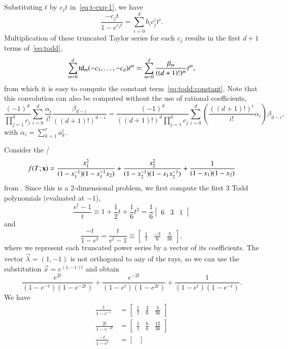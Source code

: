 Substituting $t$ by $c_j t$ in~\eqref{eq:t-exp-1}, we have
$$
\frac{-c_j t}{1-e^{c_j t}} = \sum_{i=0}^d b_i c_j^i t^i
.
$$
Multiplication of these truncated Taylor series for each $c_j$
results in the first $d+1$ terms of~\eqref{eq:todd},
$$
    \sum_{m=0}^{d} \operatorname{td}_m(-c_1, \ldots, -c_d) t^m
\eqqcolon
    \sum_{m=0}^{d} \frac{\beta_m}{((d+1)!)^m} t^m
,
$$
from which
it is easy to compute the constant term~\eqref{eq:todd:constant}.
Note that this convolution can also be computed without the use
of rational coefficients,
$$
\frac{(-1)^d}{\prod_{j=1}^d c_j}
    \sum_{i=0}^d \frac{\alpha_i}{i!} \frac{\beta_{d-i}}{((d+1)!)^{d-i}}
=
\frac{(-1)^d}{((d+1)!)^d\prod_{j=1}^d c_j}
    \sum_{i=0}^d \left(\frac{((d+1)!)^i}{i!}\alpha_i\right) \beta_{d-i}
,
$$
with $\alpha_i = \sum_{k=1}^{r} a_k^i$.

\begin{example} \label{ex:todd}
Consider the \rgf/
$$
\f T x =
\frac{x_1^2}{(1-x_1^{-1})(1-x_1^{-1}x_2)}
+
\frac{x_2^2}{(1-x_2^{-1})(1-x_1 x_2^{-1})}
+
\frac1{(1-x_1)(1-x_2)}
$$
from .
Since this is a 2-dimensional problem, we first compute the first
3 Todd polynomials (evaluated at $-1$),
$$
\frac{e^t -1}t \equiv
1 + \frac 1 2 t + \frac 1 6 t^2 =
\frac 1 6
\begin{bmatrix}
6 & 3 & 1
\end{bmatrix}
$$
and
$$
\frac {-t}{1-e^t} =
\frac t{e^t -1} \equiv
\begin{bmatrix}
\displaystyle\frac{1}{1} & \displaystyle\frac{-3}{6} & \displaystyle\frac{3}{36}
\end{bmatrix}
,
$$
where we represent each truncated power series by a vector of its
coefficients.
The vector $\vec\lambda = (1, -1)$ is not
orthogonal to any of the rays, so we can use the substitution
$\vec x = e^{(1, -1)t}$
and obtain
$$
\frac{e^{2t}}{(1-e^{-t})(1-e^{-2t})}
+
\frac{e^{-2t}}{(1-e^{t})(1-e^{2t})}
+
\frac1{(1-e^{t})(1-e^{-t})}
.
$$
We have
\begin{align*}
\frac{t}{1-e^{- t}} & = 
\begin{bmatrix}
\displaystyle\frac{1}{1} & \displaystyle\frac{3}{6} & \displaystyle\frac{3}{36}
\end{bmatrix}
\\
\frac{2t}{1-e^{-2 t}} & = 
\begin{bmatrix}
\displaystyle\frac{1}{1} & \displaystyle\frac{6}{6} & \displaystyle\frac{12}{36}
\end{bmatrix}
\\
\frac{-t}{1-e^{t}} & = 
\begin{bmatrix}

\end{bmatrix}
\end{align*}
\end{example}
